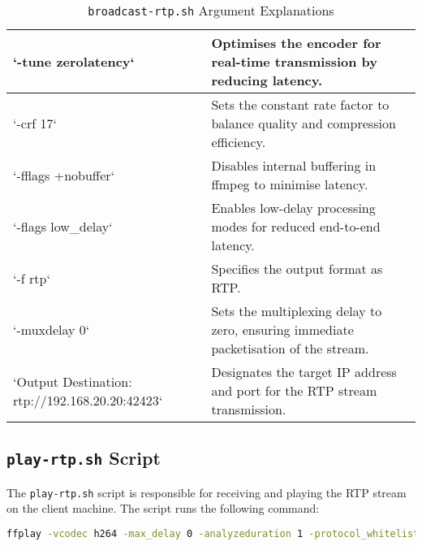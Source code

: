 \begin{table}[!ht]
{\begin{tabular}{|p{5cm}|p{10cm}|}
		`-tune zerolatency`                             & Optimises the encoder for real-time transmission by reducing latency.                                                \\ \hline
		`-crf 17`                                       & Sets the constant rate factor to balance quality and compression efficiency.                                         \\ \hline
		`-fflags +nobuffer`                             & Disables internal buffering in ffmpeg to minimise latency.                                                           \\ \hline
		`-flags low\_delay`                             & Enables low-delay processing modes for reduced end-to-end latency.                                                   \\ \hline
		`-f rtp`                                        & Specifies the output format as RTP.                                                                                  \\ \hline
		`-muxdelay 0`                                   & Sets the multiplexing delay to zero, ensuring immediate packetisation of the stream.                                 \\ \hline
		`Output Destination: rtp://192.168.20.20:42423` & Designates the target IP address and port for the RTP stream transmission.                                           \\ \hline
	\end{tabular}}
	\caption{\texttt{broadcast-rtp.sh} Argument Explanations}
	\label{tab:broadcast-args}

\end{table}



\subsection{\texttt{play-rtp.sh} Script}

The \texttt{play-rtp.sh} script is responsible for receiving and playing the RTP
stream on the client machine. The script runs the following command:

\begin{lstlisting}[language=bash]
  ffplay -vcodec h264 -max_delay 0 -analyzeduration 1 -protocol_whitelist file,udp,rtp -fflags nobuffer -strict experimental -framedrop -flags low_delay -probesize 32 -vf setpts=0 -sync ext rtp-h264.sdp
 \end{lstlisting}

